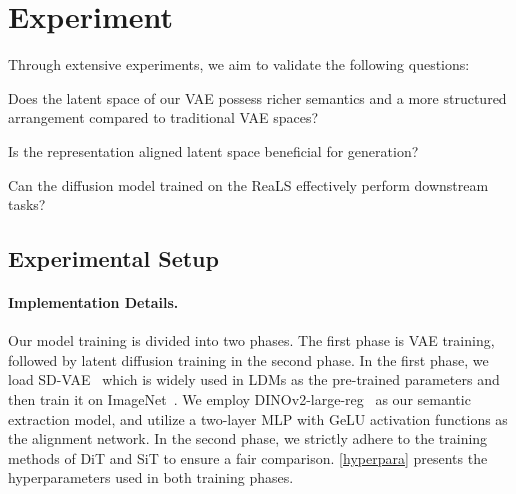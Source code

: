 \section{Experiment}

Through extensive experiments, we aim to validate the following questions:

\begin{compactitem}
  \item Does the latent space of our VAE possess richer semantics and a more structured arrangement compared to traditional VAE spaces?
  \item Is the representation aligned latent space beneficial for generation?
  \item Can the diffusion model trained on the ReaLS effectively perform downstream tasks?
\end{compactitem}

\subsection{Experimental Setup}

\paragraph{Implementation Details.} Our model training is divided into two phases. The first phase is VAE training, followed by latent diffusion training in the second phase. In the first phase, we load SD-VAE~\cite{rombach2022high} which is widely used in LDMs as the pre-trained parameters and then train it on ImageNet~\cite{deng2009imagenet}. We employ DINOv2-large-reg~\cite{oquab2023dinov2} as our semantic extraction model, and utilize a two-layer MLP with GeLU activation functions as the alignment network. In the second phase, we strictly adhere to the training methods of DiT and SiT to ensure a fair comparison. \cref{hyperpara} presents the hyperparameters used in both training phases.


